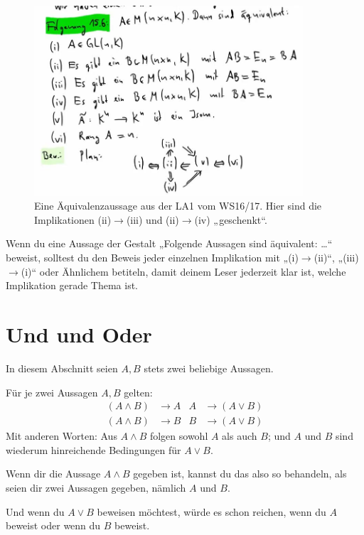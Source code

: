 \begin{bem}
    \begin{figure}[ht]
        \includegraphics[width=10cm]{./_img/equivbeweis.jpeg}
        \centering \caption{Eine Äquivalenzaussage aus der LA1 vom WS16/17. Hier sind die Implikationen (ii)$\to$(iii) und (ii)$\to$(iv) „geschenkt“.}
    \end{figure}
\end{bem}


\begin{bem}
    Wenn du eine Aussage der Gestalt „Folgende Aussagen sind äquivalent: \dots“ beweist, solltest du den Beweis jeder einzelnen Implikation mit „(i)$\to$(ii)“, „(iii)$\to$(i)“ oder Ähnlichem betiteln, damit deinem Leser jederzeit klar ist, welche Implikation gerade Thema ist.
\end{bem}





\section{Und und Oder}


In diesem Abschnitt seien $A,B$ stets zwei beliebige Aussagen.


\begin{axiom}[*]\label{undoderaxiome}
    Für je zwei Aussagen $A,B$ gelten:
    \begin{align*}
        (A\land B) & \to A & A & \to (A\lor B) \\
        (A\land B) & \to B & B & \to (A\lor B)
    \end{align*}
    Mit anderen Worten: Aus $A\land B$ folgen sowohl $A$ als auch $B$; und $A$ und $B$ sind wiederum hinreichende Bedingungen für $A\lor B$.
\end{axiom}


\begin{bem}[*]
    Wenn dir die Aussage $A\land B$ gegeben ist, kannst du das also so behandeln, als seien dir zwei Aussagen gegeben, nämlich $A$ und $B$.
    
    Und wenn du $A\lor B$ beweisen möchtest, würde es schon reichen, wenn du $A$ beweist oder wenn du $B$ beweist.
\end{bem}



